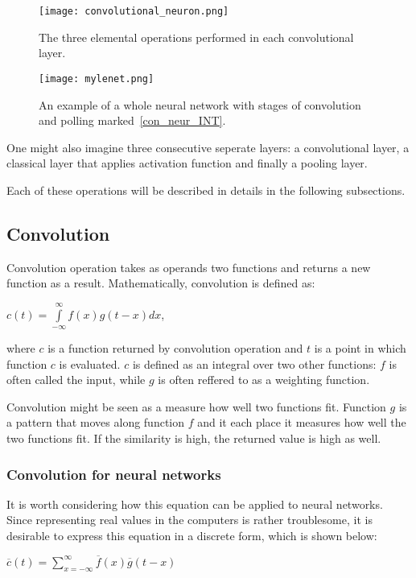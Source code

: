 \documentclass[a4paper,10pt]{report}
\begin{document}
	\begin{figure}[h!]
	  \centering
	  \texttt{[image: convolutional\_neuron.png]}
	  \caption{The three elemental operations performed in each convolutional layer.}
	  \label{fig:con_neur}
	\end{figure} 
	
	\begin{figure}[h!] %
	  \centering
	  \texttt{[image: mylenet.png]}
	  \caption{An example of a whole neural network with stages of convolution and polling marked~\ref{con_neur_INT}.}
	  \label{fig:con_neur_INT}
	\end{figure} 
	One might also imagine three consecutive seperate layers: a convolutional layer, a classical layer that applies activation function and finally a pooling layer. 
	
	Each of these operations will be described in details in the following subsections. 
	
	\subsection{Convolution}\label{sec:convolution}
	Convolution operation takes as operands two functions and returns a new function as a result. Mathematically, convolution is defined as:  
	\begin{center}
	$c(t) = \int\limits_{-\infty}^\infty f(x)g(t-x)dx$, 
	\end{center}
	
	where $c$ is a function returned by convolution operation and $t$ is a point in which function $c$ is evaluated. $c$ is defined as an integral over two other functions: $f$ is often called the input, while $g$ is often reffered to as a weighting function. 
	
	Convolution might be seen as a measure how well two functions fit. Function $g$ is a pattern that moves along function $f$ and it each place it measures how well the two functions fit. If the similarity is high, the returned value is high as well. 
		
	\subsubsection{Convolution for neural networks}
	  
	  It is worth considering how this equation can be applied to neural networks. Since representing real values in the computers is rather troublesome, it is desirable to express this equation in a discrete form, which is shown below: 
	  \begin{center}
	  $\overline{c}(t) = \sum\limits_{x = -\infty}^\infty \overline{f}(x)\overline{g}(t-x)$  
	  \end{center}
	  
\end{document}
